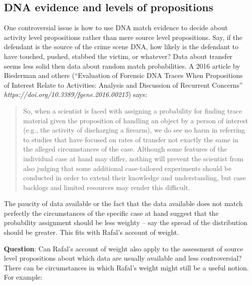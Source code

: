 \documentclass[
  10pt,
  dvipsnames,enabledeprecatedfontcommands]{scrartcl}
\begin{document}
\hypertarget{dna-evidence-and-levels-of-propositions}{%
\subsection{DNA evidence and levels of
propositions}\label{dna-evidence-and-levels-of-propositions}}

One controversial issue is how to use DNA match evidence to decide about
activity level propositions rather than mere source level propositions.
Say, if the defendant is the source of the crime scene DNA, how likely
is the defendant to have touched, pushed, stabbed the victim, or
whatever? Data about transfer seems less solid then data about random
match probabilities. A 2016 article by Biederman
and
others (``Evaluation of Forensic DNA Traces When Propositions of
Interest Relate to Activities: Analysis and Discussion of Recurrent
Concerns'' \textit{https://doi.org/10.3389/fgene.2016.00215}) says:

\begin{quote}
 So, when a scientist is faced with assigning a probability for finding trace material given the proposition of handling an object by a person of interest (e.g., the activity of discharging a firearm), we do see no harm in referring to studies that have focused on rates of transfer not exactly the same in the alleged circumstances of the case. Although some features of the individual case at hand may differ, nothing will prevent the scientist from also judging that some additional case-tailored experiments should be conducted in order to extend their knowledge and understanding, but case backlogs and limited resources may render this difficult.
\end{quote}


The paucity of data available or the fact that the data available does
not match perfectly the circumstances of the specific case at hand
suggest that the probability assignment should be less weighty -- say
the spread of the distribution should be greater. This fits with Rafal's
account of weight.


\textbf{Question}: Can Rafal's account of weight also apply to the
assessment of source level propositions about which data are usually
available and less controversial? There can be circumstances in which
Rafal's weight might still be a useful notion. For example:
\end{document}
